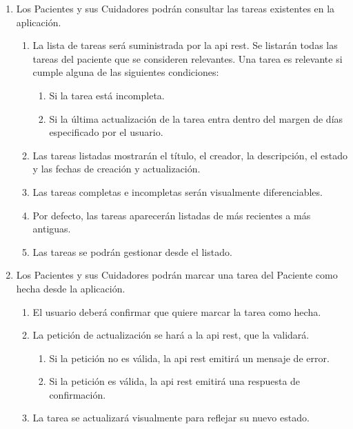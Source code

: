 \begin{enumerate}[label*=RGT \arabic*.]
\begin{enumerate}[label*=\arabic*.]
    \end{enumerate}
    \item \label{req:listar_tarea} Los Pacientes y sus Cuidadores podrán consultar las tareas existentes en la aplicación.
    \begin{enumerate}[label*=\arabic*.]
        \item \label{req:tarea_relevancia} La lista de tareas será suministrada por la \acrshort{api} \acrshort{rest}. Se listarán todas las tareas del paciente que se consideren relevantes. Una tarea es relevante si cumple alguna de las siguientes condiciones:
        \begin{enumerate}[label*=\arabic*.]
            \item Si la tarea está incompleta.
            \item Si la última actualización de la tarea entra dentro del margen de días especificado por el usuario.
        \end{enumerate}
        \item \label{req:info_tarea} Las tareas listadas mostrarán el título, el creador, la descripción, el estado y las fechas de creación y actualización.
        \item Las tareas completas e incompletas serán visualmente diferenciables.
        \item Por defecto, las tareas aparecerán listadas de más recientes a más antiguas.
        \item Las tareas se podrán gestionar desde el listado.
    \end{enumerate}
    \item \label{req:marcar_tarea_hecha} Los Pacientes y sus Cuidadores podrán marcar una tarea del Paciente como hecha desde la aplicación.
    \begin{enumerate}[label*=\arabic*.]
        \item El usuario deberá confirmar que quiere marcar la tarea como hecha.
        \item La petición de actualización se hará a la \acrshort{api} \acrshort{rest}, que la validará.
        \begin{enumerate}[label*=\arabic*.]
            \item Si la petición no es válida, la \acrshort{api} \acrshort{rest} emitirá un mensaje de error.
            \item Si la petición es válida, la \acrshort{api} \acrshort{rest} emitirá una respuesta de confirmación.
        \end{enumerate}
        \item La tarea se actualizará visualmente para reflejar su nuevo estado.

\end{enumerate}
\end{enumerate}
